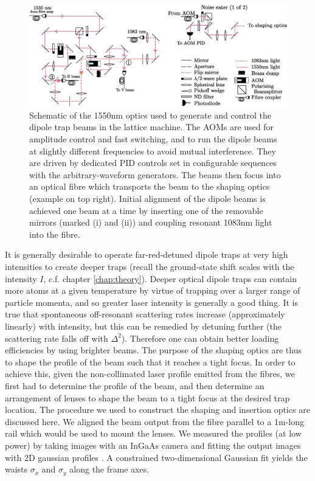 	
	
	\begin{figure}
		\centering
		\includegraphics[width=\textwidth]{fig/lattice/dipole_optics}
		\caption{Schematic of the 1550nm optics used to generate and control the dipole trap beams in the lattice machine.
		The AOMs are used for amplitude control and fast switching, and to run the dipole beams at slightly different frequencies to avoid mutual interference.
		They are driven by dedicated PID controls set in configurable sequences with the arbitrary-waveform generators.
		The beams then focus into an optical fibre which transports the beam to the shaping optics (example on top right).
		Initial alignment of the dipole beams is achieved one beam at a time by inserting one of the removable mirrors (marked (i) and (ii)) and coupling resonant 1083nm light into the fibre.}
		\label{fig:dipole_optics}
	\end{figure}
	

	It is generally desirable to operate far-red-detuned dipole traps at very high intensities to create deeper traps (recall the ground-state shift scales with the intensity $I$, c.f. chapter \ref{chap:theory}).
	Deeper optical dipole traps can contain more atoms at a given temperature by virtue of trapping over a larger range of particle momenta, and so greater laser intensity is generally a good thing.
	It is true that spontaneous off-resonant scattering rates increase (approximately linearly) with intensity, but this can be remedied by detuning further (the scattering rate falls off with $\Delta^2$).
	Therefore one can obtain better loading efficiencies by using brighter beams.
	The purpose of the shaping optics are thus to shape the profile of the beam such that it reaches a tight focus.
	In order to achieve this, given the non-collimated laser profile emitted from the fibres, we first had to determine the profile of the beam, and then determine an arrangement of lenses to shape the beam to a tight focus at the desired trap location.
	The procedure we used to construct the shaping and insertion optics are discussed here.
	We aligned the beam output from the fibre parallel to a 1m-long rail which would be used to mount the lenses.
	We measured the profiles (at low power) by taking images with an InGaAs camera and fitting the output images with 2D gaussian profiles .
	A constrained two-dimensional Gaussian fit yields the waists $\sigma_x$ and $\sigma_y$ along the frame axes.


